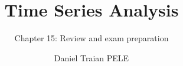 \title[Time Series Analysis]{Time Series Analysis}
\subtitle{Chapter 15: Review and exam preparation}
\author[D.T. Pele]{Daniel Traian PELE}
\date{}

\providecommand{\tsaapplink}[3]{\hypertarget{#2}{}\hyperlink{#1}{\beamergotobutton{#3}}}  %
\providecommand{\tsaappback}[2]{\begin{tikzpicture}[remember picture,overlay]\node[anchor=south east] at ([xshift=-3mm,yshift=7mm]current page.south east){\hyperlink{#1}{\beamerreturnbutton{#2}}};\end{tikzpicture}}  %
\providecommand{\tsachlink}[2]{\href{#1}{#2}}  %
\providecommand{\tsachlinkt}[2]{\href{#1}{\usebeamercolor[fg]{frametitle}#2}}  %



